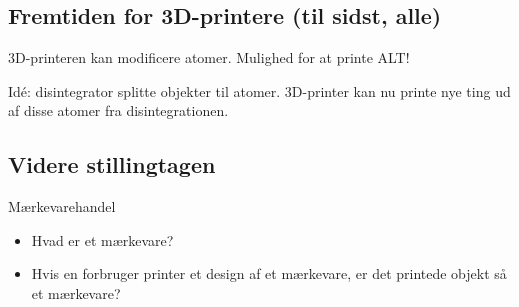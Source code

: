 \subsection{Fremtiden for 3D-printere (til sidst, alle)} %
\label{sub:fremtiden_for_3d_printere_til_sidst_alle_}

3D-printeren kan modificere atomer. Mulighed for at printe ALT!

Idé: disintegrator splitte objekter til atomer. 3D-printer kan nu printe nye ting ud af disse atomer fra disintegrationen.


\subsection{Videre stillingtagen} %
\label{sub:videre_stillingtagen}

Mærkevarehandel

\begin{itemize}
	\item Hvad er et mærkevare?
	\item Hvis en forbruger printer et design af et mærkevare, er det printede objekt så et mærkevare?
	
\end{itemize}




